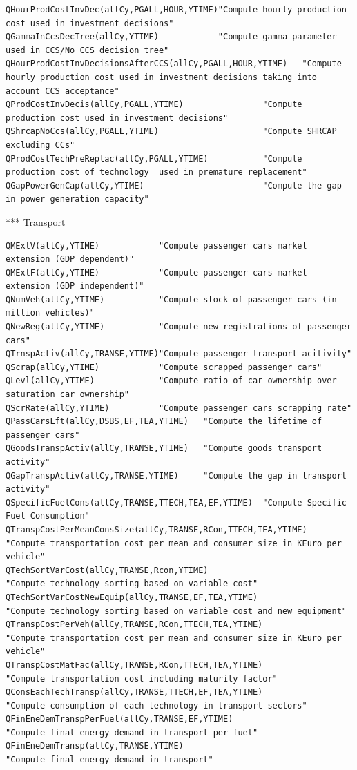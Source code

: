 \documentclass[a4paper,]{scrartcl}
\begin{document}
\begin{lstlisting}
QHourProdCostInvDec(allCy,PGALL,HOUR,YTIME)"Compute hourly production cost used in investment decisions"
QGammaInCcsDecTree(allCy,YTIME)            "Compute gamma parameter used in CCS/No CCS decision tree"
QHourProdCostInvDecisionsAfterCCS(allCy,PGALL,HOUR,YTIME)   "Compute hourly production cost used in investment decisions taking into account CCS acceptance"
QProdCostInvDecis(allCy,PGALL,YTIME)                "Compute production cost used in investment decisions"
QShrcapNoCcs(allCy,PGALL,YTIME)                     "Compute SHRCAP excluding CCs"
QProdCostTechPreReplac(allCy,PGALL,YTIME)           "Compute production cost of technology  used in premature replacement"  
QGapPowerGenCap(allCy,YTIME)                        "Compute the gap in power generation capacity"                                              
\end{lstlisting}

*** Transport

\begin{lstlisting}
QMExtV(allCy,YTIME)            "Compute passenger cars market extension (GDP dependent)"
QMExtF(allCy,YTIME)            "Compute passenger cars market extension (GDP independent)"
QNumVeh(allCy,YTIME)           "Compute stock of passenger cars (in million vehicles)"
QNewReg(allCy,YTIME)           "Compute new registrations of passenger cars"
QTrnspActiv(allCy,TRANSE,YTIME)"Compute passenger transport acitivity"
QScrap(allCy,YTIME)            "Compute scrapped passenger cars"
QLevl(allCy,YTIME)             "Compute ratio of car ownership over saturation car ownership"
QScrRate(allCy,YTIME)          "Compute passenger cars scrapping rate"
QPassCarsLft(allCy,DSBS,EF,TEA,YTIME)   "Compute the lifetime of passenger cars"    
QGoodsTranspActiv(allCy,TRANSE,YTIME)   "Compute goods transport activity"
QGapTranspActiv(allCy,TRANSE,YTIME)     "Compute the gap in transport activity" 
QSpecificFuelCons(allCy,TRANSE,TTECH,TEA,EF,YTIME)  "Compute Specific Fuel Consumption"
QTranspCostPerMeanConsSize(allCy,TRANSE,RCon,TTECH,TEA,YTIME)   "Compute transportation cost per mean and consumer size in KEuro per vehicle"
QTechSortVarCost(allCy,TRANSE,Rcon,YTIME)                       "Compute technology sorting based on variable cost" 
QTechSortVarCostNewEquip(allCy,TRANSE,EF,TEA,YTIME)             "Compute technology sorting based on variable cost and new equipment"   
QTranspCostPerVeh(allCy,TRANSE,RCon,TTECH,TEA,YTIME)            "Compute transportation cost per mean and consumer size in KEuro per vehicle"
QTranspCostMatFac(allCy,TRANSE,RCon,TTECH,TEA,YTIME)            "Compute transportation cost including maturity factor" 
QConsEachTechTransp(allCy,TRANSE,TTECH,EF,TEA,YTIME)            "Compute consumption of each technology in transport sectors"
QFinEneDemTranspPerFuel(allCy,TRANSE,EF,YTIME)                  "Compute final energy demand in transport per fuel"
QFinEneDemTransp(allCy,TRANSE,YTIME)                            "Compute final energy demand in transport"                      
\end{lstlisting}
\end{document}
